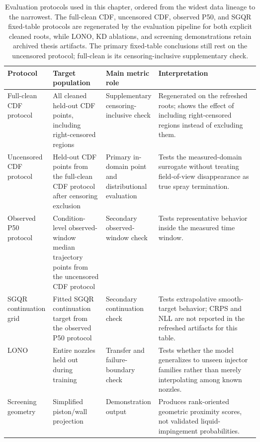 \begin{table}[H]
\centering
\footnotesize
\setlength{\tabcolsep}{4pt}
\begin{tabularx}{\linewidth}{@{}L{0.18\linewidth}L{0.21\linewidth}L{0.20\linewidth}Y@{}}
\toprule
Protocol & Target population & Main metric role & Interpretation \\
\midrule
Full-clean CDF protocol & All cleaned held-out CDF points, including right-censored regions & Supplementary censoring-inclusive check & Regenerated on the refreshed roots; shows the effect of including right-censored regions instead of excluding them. \\
Uncensored CDF protocol & Held-out CDF points from the full-clean CDF protocol after censoring exclusion & Primary in-domain point and distributional evaluation & Tests the measured-domain surrogate without treating field-of-view disappearance as true spray termination. \\
Observed P50 protocol & Condition-level observed-window median trajectory points from the uncensored CDF protocol & Secondary observed-window check & Tests representative behavior inside the measured time window. \\
SGQR continuation grid & Fitted SGQR continuation target from the observed P50 protocol & Secondary continuation check & Tests extrapolative smooth-target behavior; CRPS and NLL are not reported in the refreshed artifacts for this table. \\
LONO & Entire nozzles held out during training & Transfer and failure-boundary check & Tests whether the model generalizes to unseen injector families rather than merely interpolating among known nozzles. \\
Screening geometry & Simplified piston/wall projection & Demonstration output & Produces rank-oriented geometric proximity scores, not validated liquid-impingement probabilities. \\
\bottomrule
\end{tabularx}
\caption{Evaluation protocols used in this chapter, ordered from the widest data lineage to the narrowest. The full-clean CDF, uncensored CDF, observed P50, and SGQR fixed-table protocols are regenerated by the evaluation pipeline for both explicit cleaned roots, while LONO, KD ablations, and screening demonstrations retain archived thesis artifacts. The primary fixed-table conclusions still rest on the uncensored protocol; full-clean is its censoring-inclusive supplementary check.}
\label{tab:protocol-map-rewrite}
\end{table}

